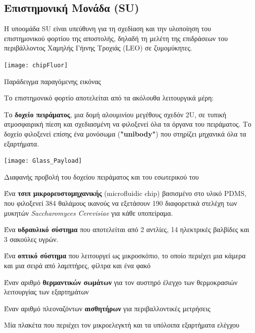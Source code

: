 \documentclass[a4paper,nobib]{tufte-book}
\begin{document}
\subsection{Επιστημονική Μονάδα (\acs{SU})}

Η υποομάδα \acl{SU} είναι υπεύθυνη για τη σχεδίαση και την υλοποίηση του επιστημονικού φορτίου της αποστολής, δηλαδή τη μελέτη της επιδράσεων του περιβάλλοντος Χαμηλής Γήινης Τροχιάς (\ac{LEO}) σε ζυμομύκητες.

\begin{marginfigure}
	\texttt{[image: chipFluor]}
	\caption[Παράδειγμα παραγόμενης εικόνας]{Παράδειγμα παραγόμενης εικόνας \autocite{DDJF_PL}}
	\label{fig:chip_fluor}
\end{marginfigure}

Το επιστημονικό φορτίο αποτελείται από τα ακόλουθα λειτουργικά μέρη: \autocite{DDJF_PL}
\begin{compactitem}
	\item Το \textbf{δοχείο πειράματος}, μια δομή αλουμινίου μεγέθους σχεδόν 2U, σε τυπική ατμοσφαιρική πίεση και σχεδιασμένη να φιλοξενεί όλα τα όργανα του πειράματος. Το δοχείο φιλοξενεί επίσης ένα μονόσωμα (\textbf{"unibody"}) που στηρίζει μηχανικά όλα τα εξαρτήματα.
	\begin{marginfigure}
		\centering
		\texttt{[image: Glass\_Payload]}
		\caption{Διαφανής προβολή του δοχείου πειράματος και του εσωτερικού του}
		\label{fig:container}
	\end{marginfigure}
	\item Ένα \textbf{τσιπ μικρορευστομηχανικής} (microfluidic chip) βασισμένο στο υλικό \acs{PDMS}, που φιλοξενεί 384 θαλάμους ικανούς να εξετάσουν 190 διαφορετικά στελέχη των μυκητών \emph{Saccharomyces Cerevisiae} για κάθε υποπείραμα.
	\item Ένα \textbf{υδραυλικό σύστημα} που αποτελείται από 2 αντλίες, 14 ηλεκτρικές βαλβίδες και 3 σακούλες υγρών.
	\item Ένα \textbf{οπτικό σύστημα} που λειτουργεί ως μικροσκόπιο, το οποίο περιέχει μια κάμερα και μια σειρά από λαμπτήρες, φίλτρα και ένα φακό
	\item Έναν αριθμό \textbf{θερμαντικών σωμάτων} για τον αυστηρό έλεγχο των θερμοκρασιών λειτουργίας των εξαρτημάτων
	\item Έναν αριθμό πλεοναζόντων \textbf{αισθητήρων} για περιβαλλοντικές μετρήσεις
	\item Μία πλακέτα που περιέχει τον μικροελεγκτή και τα υπόλοιπα εξαρτήματα ελέγχου
\end{compactitem}
\end{document}
